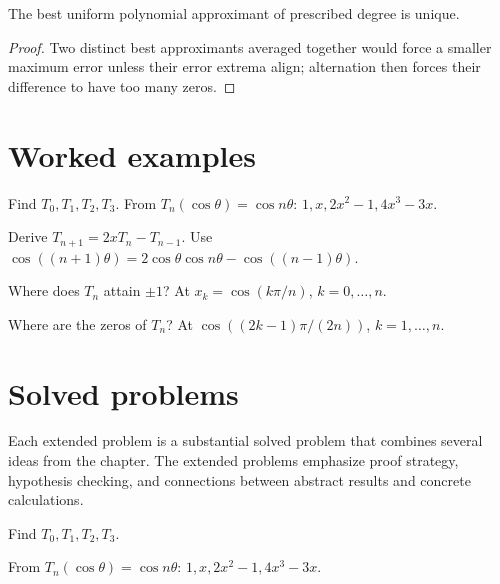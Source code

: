 \begin{theorem}\label{thm:ii22-03}
The best uniform polynomial approximant of prescribed degree is unique.
\begin{proof}
Two distinct best approximants averaged together would force a smaller maximum error unless their error extrema align; alternation then forces their difference to have too many zeros.
\end{proof}
\end{theorem}

\section{Worked examples}

\begin{example}\label{ex:ii22-worked-01}
Find $T_0,T_1,T_2,T_3$. From $T_n(\cos\theta)=\cos n\theta$: $1,x,2x^2-1,4x^3-3x$.
\end{example}

\begin{example}[Recurrence]\label{ex:ii22-worked-02}
Derive $T_{n+1}=2xT_n-T_{n-1}$. Use $\cos((n+1)\theta)=2\cos\theta\cos n\theta-\cos((n-1)\theta)$.
\end{example}

\begin{example}[Extrema]\label{ex:ii22-worked-03}
Where does $T_n$ attain $\pm1$? At $x_k=\cos(k\pi/n)$, $k=0,\dots,n$.
\end{example}

\begin{example}[Zeros]\label{ex:ii22-worked-04}
Where are the zeros of $T_n$? At $\cos((2k-1)\pi/(2n))$, $k=1,\dots,n$.
\end{example}

\section{Solved problems}
Each extended problem is a substantial solved problem that combines several ideas from the chapter. The extended problems emphasize proof strategy, hypothesis checking, and connections between abstract results and concrete calculations.

\begin{problem}\label{prob:ii22-problem-01}
Find $T_0,T_1,T_2,T_3$.
\end{problem}
\begin{solution}
From $T_n(\cos\theta)=\cos n\theta$: $1,x,2x^2-1,4x^3-3x$.
\end{solution}

